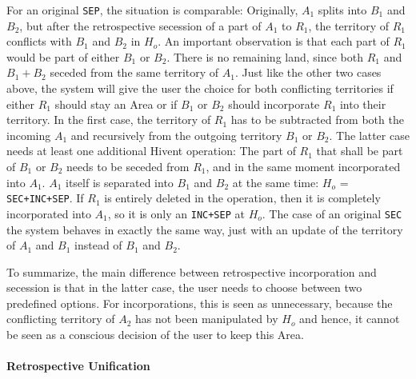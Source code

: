 For an original \texttt{SEP}, the situation is comparable: Originally, $A_1$ splits into $B_1$ and $B_2$, but after the retrospective secession of a part of $A_1$ to $R_1$, the territory of $R_1$ conflicts with $B_1$ and $B_2$ in $H_o$. An important observation is that each part of $R_1$ would be part of either $B_1$ or $B_2$. There is no remaining land, since both $R_1$ and $B_1+B_2$ seceded from the same territory of $A_1$. Just like the other two cases above, the system will give the user the choice for both conflicting territories if either $R_1$ should stay an Area or if $B_1$ or $B_2$ should incorporate $R_1$ into their territory. In the first case, the territory of $R_1$ has to be subtracted from both the incoming $A_1$ and recursively from the outgoing territory $B_1$ or $B_2$. The latter case needs at least one additional Hivent operation: The part of $R_1$ that shall be part of $B_1$ or $B_2$ needs to be seceded from $R_1$, and in the same moment incorporated into $A_1$. $A_1$ itself is separated into $B_1$ and $B_2$ at the same time: $H_o$ = \texttt{SEC+INC+SEP}. If $R_1$ is entirely deleted in the operation, then it is completely incorporated into $A_1$, so it is only an \texttt{INC+SEP} at $H_o$. The case of an original \texttt{SEC} the system behaves in exactly the same way, just with an update of the territory of $A_1$ and $B_1$ instead of $B_1$ and $B_2$.

To summarize, the main difference between retrospective incorporation and secession is that in the latter case, the user needs to choose between two predefined options. For incorporations, this is seen as unnecessary, because the conflicting territory of $A_2$ has not been manipulated by $H_o$ and hence, it cannot be seen as a conscious decision of the user to keep this Area.


\paragraph{Retrospective Unification} %
\label{par:retrospective_unification}

